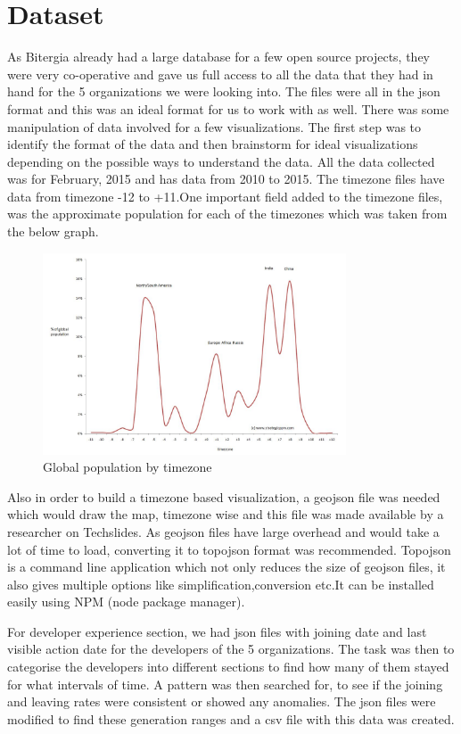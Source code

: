 \documentclass[seploa]{beavtex}
\begin{document}
\section{Dataset}
As Bitergia already had a large database for a few open source projects, they were very co-operative and gave us full access to all the data that they had in hand for the 5 organizations we were looking into. The files were all in the json format and this was an ideal format for us to work with as well. There was some manipulation of data involved for a few visualizations. The first step was to identify the format of the data and then brainstorm for ideal visualizations depending on the possible ways to understand the data. All the data collected was for February, 2015 and has data from 2010 to 2015. The timezone files have data from timezone -12 to +11.One important field added to the timezone files, was the approximate population for each of the timezones which was taken from the below graph.

\begin{figure}[!ht]
\centering
\includegraphics[width=90mm]{pop1.jpg}
\caption{Global population by timezone}
\end{figure}

Also in order to build a timezone based visualization, a geojson file was needed which would draw the map, timezone wise and this file was made available by a researcher on Techslides. As geojson files have large overhead and would take a lot of time to load, converting it to topojson format was recommended\cite{tech}. Topojson is a command line application which not only reduces the size of geojson files, it also gives multiple options like simplification,conversion etc.It can be installed easily using NPM (node package manager). 

For developer experience section, we had json files with joining date and last visible action date for the developers of the 5 organizations. The task was then to categorise the developers into different sections to find how many of them stayed for what intervals of time. A pattern was then searched for, to see if the joining and leaving rates were consistent or showed any anomalies. The json files were modified to find these generation ranges and a csv file with this data was created.
\end{document}
